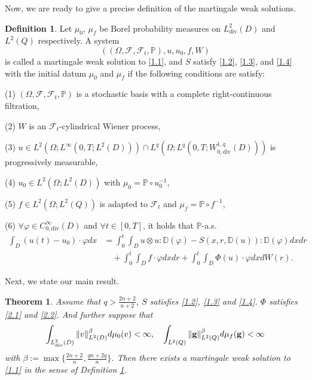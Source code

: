 \documentclass[reqno]{amsart}
\newtheorem{Theorem}{Theorem}[section]
\theoremstyle{definition}
\newtheorem{Definition}{Definition}[section]
\theoremstyle{remark}
\numberwithin{equation}{section} \allowdisplaybreaks
\begin{document}
Now, we are ready to give a precise definition of the  martingale
weak solutions.
\begin{Definition}\label{def2.1}
Let  $\mu_0$, $\mu_f$ be Borel probability measures on
$L^2_{\text{div}}(D)$ and $L^2(Q)$ respectively. A system
$$((\Omega,\mathscr{F},\mathscr{F}_{t},\mathbb{P}),u,u_0,f,W)$$
is called a martingale weak solution to \eqref{1.1}, and $S$ satisfy
\eqref{1.2}, \eqref{1.3}, and \eqref{1.4} with the initial datum
$\mu_0$ and $\mu_f$  if the following conditions are satisfy:

(1) $(\Omega,\mathscr{F},\mathscr{F}_t,\mathbb{P})$ is a stochastic
basis with a complete right-continuous filtration,

(2) $W$ is an $\mathscr{F}_t$-cylindrical Wiener process,

(3) $u\in L^2(\Omega; L^{\infty}(0,T;L^2(D)))\cap L^q(\Omega;
L^{q}(0,T;W^{1,q}_{0,\text{div}}(D)))$ is progressively measurable,

(4) $u_0\in L^2(\Omega; L^{2}(D))$ with $\mu_0=\mathbb{P}\circ
u_0^{-1}$,

(5) $f\in L^2(\Omega; L^{2}({Q}))$ is adapted to
$\mathscr{F}_t$ and $\mu_f=\mathbb{P}\circ f^{-1}$,

(6) $\forall \varphi\in C_{0,\text{div}}^{\infty}(D)$ and $\forall
t\in [0,T]$, it holds that $\mathbb{P}$-a.s.
\begin{align*}
\int_{D}(u(t)-u_0)\cdot\varphi
dx\!&=\!\!\int_0^t\!\!\!\int_{D}u\otimes u
:\mathbb{D}(\varphi)-S(x,r,\mathbb{D}(u)):\mathbb{D}(\varphi) dxdr\\
&\quad+\!\int_0^t\!\!\!\int_{D}f\cdot \varphi dx dr
+\!\int_0^t\!\!\!\int_{D}\Phi(u)\cdot \varphi dxdW(r).
\end{align*}

\end{Definition}


Next, we state our main result.

\begin{Theorem}
Assume that $q>\frac{2n+2}{n+2}$, $S$ satisfies \eqref{1.2},
\eqref{1.3} and \eqref{1.4}. $\Phi$ satisfies \eqref{2.1} and
\eqref{2.2}. And further suppose that
\begin{equation}\label{2.4}
\begin{split}
\int_{L^2_{\rm{
div}}(D)}\|v\|^{\beta}_{L^2(D)}d\mu_0(v)<\infty,\quad
\int_{L^2(Q)}\|\mathbf{g}\|^{\beta}_{L^2(Q)}d\mu_f(\mathbf{g})<\infty
\end{split}
\end{equation}
with $\beta:=\max\{\frac{2n+2}{n},\frac{qn+2q}{n}\}$. Then there
exists a martingale weak solution to \eqref{1.1} in the sense of
Definition \ref{def2.1}.
\end{Theorem}
\end{document}
